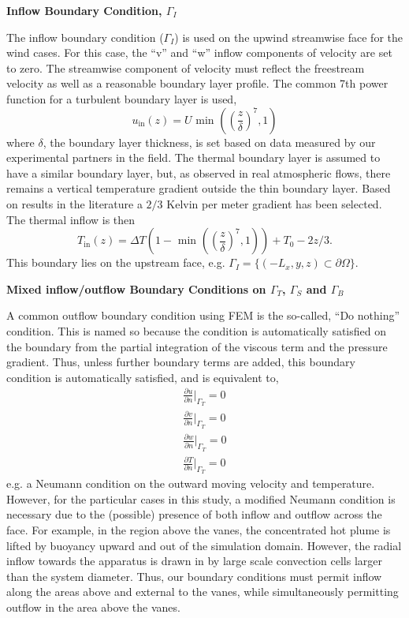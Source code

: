 \textbf{Inflow Boundary Condition, $\Gamma_I$} 

The inflow boundary condition ($\Gamma_I$) 
is used on the upwind streamwise face for the wind cases. For this case, 
the ``v'' and ``w'' inflow components of velocity are set to zero. 
The streamwise component of velocity must reflect the freestream velocity as 
well as a reasonable boundary layer profile. 
The common 7th power function for a turbulent boundary layer is used,   
\begin{equation*}
  u_{\text{in}}(z) = U \text{ min }\left(\left(\frac{z}{\delta}\right)^7,1\right)
  \label{eq:bl_u}
\end{equation*}
where $\delta$, the boundary layer thickness, is set based on data
measured by our experimental partners in the field. 
The thermal boundary layer is assumed to have a similar boundary layer,
but, as observed in real atmospheric flows, there remains a vertical
temperature gradient outside the thin boundary layer. Based on
results in the literature a $2/3$ Kelvin per meter gradient has been
selected\cite{Blocken2007238}. The thermal inflow is then  
\begin{equation*}
  T_{\text{in}}(z) = \Delta T \left(1- \text{ min
			}\left(\left(\frac{z}{\delta}\right)^7,1\right)\right)
  + T_0 - 2z/3.  
  \label{eq:bl_t}
\end{equation*}
This boundary lies on the upstream face, e.g. $\Gamma_I = \{(-L_x,y,z)
\subset \partial \Omega \} $.  

\textbf{Mixed inflow/outflow Boundary Conditions on $\Gamma_T$,
$\Gamma_S$ and $\Gamma_B$}  

A common outflow boundary condition using FEM is the so-called, ``Do
nothing'' condition. This is named so because the condition is
automatically satisfied on the boundary from the partial integration of
the viscous term and the pressure gradient. Thus, unless further
boundary terms are added, this boundary condition is automatically
satisfied, and is equivalent to,
\begin{align}
  \frac{\partial u}{\partial n}\bigg|_{\Gamma_T} = 0 \\
  \frac{\partial v}{\partial n}\bigg|_{\Gamma_T} = 0 \\
  \frac{\partial w}{\partial n}\bigg|_{\Gamma_T} = 0 \\
  \frac{\partial T}{\partial n}\bigg|_{\Gamma_T} = 0
\end{align}
e.g. a Neumann condition on the outward moving velocity and temperature. 
However, for the particular cases in this study, 
a modified Neumann condition is necessary due to the (possible) presence of
both inflow and outflow across the face. 
For example, in the region above the vanes, the concentrated hot plume is
lifted by buoyancy upward and out of the simulation domain. However, the
radial inflow towards the apparatus is drawn in by large scale
convection cells larger than the system diameter. Thus, our boundary
conditions must permit inflow along the areas above and external to the
vanes, while simultaneously permitting outflow in the area above the vanes. 

